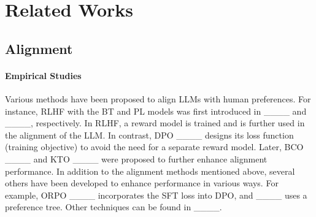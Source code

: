 \section{Related Works}
\subsection{Alignment}
\paragraph{Empirical Studies} Various methods have been proposed to align LLMs with human preferences. For instance, RLHF with the BT and PL models was first introduced in ____ and ____, respectively. In RLHF, a reward model is trained and is further used in the alignment of the LLM. In contrast, DPO ____ designs its loss function (training objective) to avoid the need for a separate reward model. Later, BCO ____ and KTO ____ were proposed to further enhance alignment performance. In addition to the alignment methods mentioned above, several others have been developed to enhance performance in various ways. For example, ORPO ____ incorporates the SFT loss into DPO, and ____ uses a preference tree. Other techniques can be found in ____.



\vspace{-0.1in}
